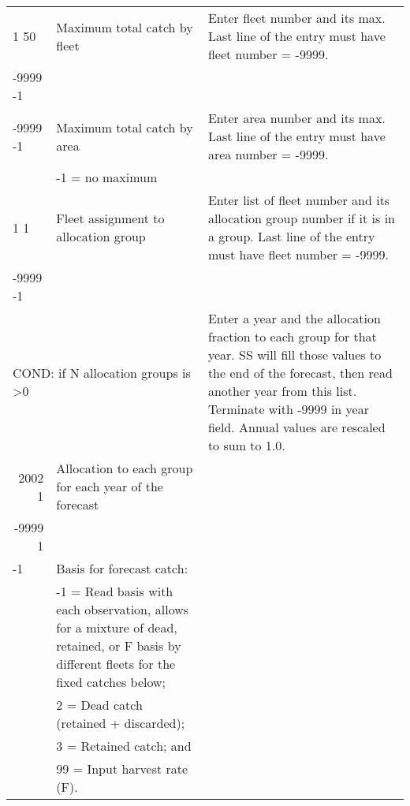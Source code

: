 \begin{landscape}
{\begin{longtable}{p{3.2cm} p{7cm} p{10.8cm}}
  \hline
  1 50 & Maximum total catch by fleet & \multirow{1}{1cm}[-0.25cm]{\parbox{11cm}{Enter fleet number and its max. Last line of the entry must have fleet number = -9999.}} \Tstrut\\
  -9999 -1 & & \Bstrut\\
  \hline
  
  -9999 -1 & Maximum total catch by area & \multirow{1}{1cm}[-0.25cm]{\parbox{11cm}{Enter area number and its max. Last line of the entry must have area number = -9999.}} \Tstrut\\
     & -1 = no maximum & \Bstrut\\
     
  \hline
  1 1  & Fleet assignment to allocation group & \multirow{1}{1cm}[-0.25cm]{\parbox{11cm}{Enter list of fleet number and its allocation group number if it is in a group. Last line of the entry must have fleet number = -9999.}} \Tstrut\\
  -9999 -1  & &  \Bstrut\\ 
    
  \hline 
  \multicolumn{2}{l}{COND: if N allocation groups is >0 } & \multirow{1}{1cm}[-0.25cm]{\parbox{11cm}{ Enter a year and the allocation fraction to each group for that year.  SS will fill those values to the end of the forecast, then read another year from this list.  Terminate with -9999 in year field. Annual values are rescaled to sum to 1.0.}} \Tstrut \\
  \multicolumn{1}{r}{2002 1}  & Allocation to each group for each year of the forecast & \\
  \multicolumn{1}{r}{-9999 1} & & \Bstrut\\
  
  \pagebreak
    -1 & Basis for forecast catch: & \Tstrut\\
    & -1 = Read basis with each observation, allows for a mixture of dead, retained, or F basis by different fleets for the fixed catches below; & \\
    & 2 = Dead catch (retained + discarded); & \\
    & 3 = Retained catch; and & \\
    & 99 = Input harvest rate (F). & \Bstrut\\
    

\end{longtable}}
\end{landscape}
